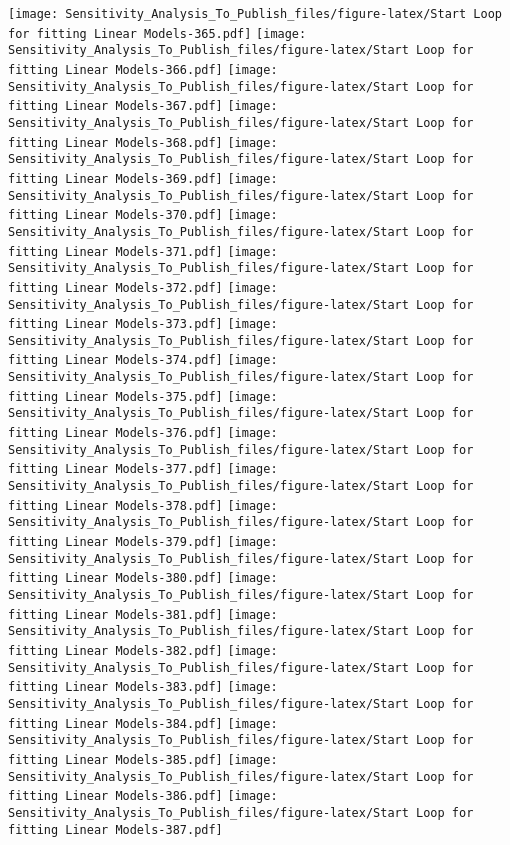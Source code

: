 \documentclass[
]{article}
\begin{document}
\texttt{[image: Sensitivity\_Analysis\_To\_Publish\_files/figure-latex/Start Loop for fitting Linear Models-365.pdf]}
\texttt{[image: Sensitivity\_Analysis\_To\_Publish\_files/figure-latex/Start Loop for fitting Linear Models-366.pdf]}
\texttt{[image: Sensitivity\_Analysis\_To\_Publish\_files/figure-latex/Start Loop for fitting Linear Models-367.pdf]}
\texttt{[image: Sensitivity\_Analysis\_To\_Publish\_files/figure-latex/Start Loop for fitting Linear Models-368.pdf]}
\texttt{[image: Sensitivity\_Analysis\_To\_Publish\_files/figure-latex/Start Loop for fitting Linear Models-369.pdf]}
\texttt{[image: Sensitivity\_Analysis\_To\_Publish\_files/figure-latex/Start Loop for fitting Linear Models-370.pdf]}
\texttt{[image: Sensitivity\_Analysis\_To\_Publish\_files/figure-latex/Start Loop for fitting Linear Models-371.pdf]}
\texttt{[image: Sensitivity\_Analysis\_To\_Publish\_files/figure-latex/Start Loop for fitting Linear Models-372.pdf]}
\texttt{[image: Sensitivity\_Analysis\_To\_Publish\_files/figure-latex/Start Loop for fitting Linear Models-373.pdf]}
\texttt{[image: Sensitivity\_Analysis\_To\_Publish\_files/figure-latex/Start Loop for fitting Linear Models-374.pdf]}
\texttt{[image: Sensitivity\_Analysis\_To\_Publish\_files/figure-latex/Start Loop for fitting Linear Models-375.pdf]}
\texttt{[image: Sensitivity\_Analysis\_To\_Publish\_files/figure-latex/Start Loop for fitting Linear Models-376.pdf]}
\texttt{[image: Sensitivity\_Analysis\_To\_Publish\_files/figure-latex/Start Loop for fitting Linear Models-377.pdf]}
\texttt{[image: Sensitivity\_Analysis\_To\_Publish\_files/figure-latex/Start Loop for fitting Linear Models-378.pdf]}
\texttt{[image: Sensitivity\_Analysis\_To\_Publish\_files/figure-latex/Start Loop for fitting Linear Models-379.pdf]}
\texttt{[image: Sensitivity\_Analysis\_To\_Publish\_files/figure-latex/Start Loop for fitting Linear Models-380.pdf]}
\texttt{[image: Sensitivity\_Analysis\_To\_Publish\_files/figure-latex/Start Loop for fitting Linear Models-381.pdf]}
\texttt{[image: Sensitivity\_Analysis\_To\_Publish\_files/figure-latex/Start Loop for fitting Linear Models-382.pdf]}
\texttt{[image: Sensitivity\_Analysis\_To\_Publish\_files/figure-latex/Start Loop for fitting Linear Models-383.pdf]}
\texttt{[image: Sensitivity\_Analysis\_To\_Publish\_files/figure-latex/Start Loop for fitting Linear Models-384.pdf]}
\texttt{[image: Sensitivity\_Analysis\_To\_Publish\_files/figure-latex/Start Loop for fitting Linear Models-385.pdf]}
\texttt{[image: Sensitivity\_Analysis\_To\_Publish\_files/figure-latex/Start Loop for fitting Linear Models-386.pdf]}
\texttt{[image: Sensitivity\_Analysis\_To\_Publish\_files/figure-latex/Start Loop for fitting Linear Models-387.pdf]}
\end{document}
